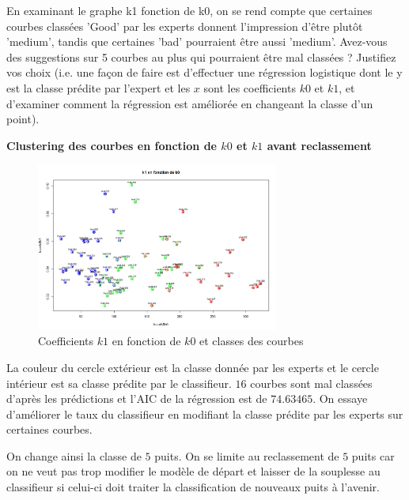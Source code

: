 \documentclass[12pt]{article}
\begin{document}
En examinant le graphe k1 fonction de k0, on se rend compte que certaines courbes
class\'ees 'Good' par les experts donnent l'impression d'\^etre plut\^ot 'medium', tandis que
certaines 'bad' pourraient \^etre aussi 'medium'. 
\newline
Avez-vous des suggestions sur 5 courbes au
plus qui pourraient \^etre mal class\'ees ? 
\newline
Justifiez vos choix (i.e. une fa\c con de faire est d'effectuer une r\'egression logistique dont le y est la classe pr\'edite par l'expert et les $x$ sont les coefficients $k0$ et $k1$, et d'examiner comment la r\'egression est am\'elior\'ee en changeant la
classe d'un point).

\textbf{Clustering des courbes en fonction de $k0$ et $k1$ avant reclassement}

\begin{figure}[H]
 \centering %
	\includegraphics[width=300px]{clustering}
  \caption{\label{fig:k0_k1} Coefficients $k1$ en fonction de $k0$ et classes des courbes}
\end{figure}

La couleur du cercle ext\'erieur est la classe donnée par les experts et le cercle int\'erieur est sa classe pr\'edite par le classifieur.
\newline 
$16$ courbes sont mal class\'ees d'apr\`es les pr\'edictions et l'AIC de la r\'egression est de $74.63465$. 
\newline 
On essaye d'améliorer le taux du classifieur en modifiant la classe prédite par les experts sur certaines courbes.
\newline 

On change ainsi la classe de $5$ puits. 
\newline
On se limite au reclassement de $5$ puits car on ne veut pas trop modifier le mod\`ele de d\'epart et laisser de la souplesse au classifieur si celui-ci doit traiter la classification de nouveaux puits à l'avenir.
\newline
\end{document}
